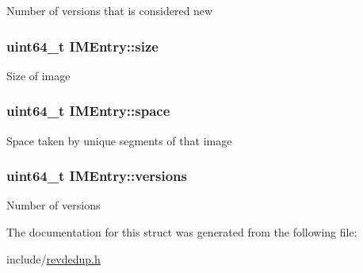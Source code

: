 \-Number of versions that is considered new \hypertarget{structIMEntry_a840792a083a5fea0688ecb8ef81b64ff}{
\subsubsection[{size}]{\setlength{\rightskip}{0pt plus 5cm}uint64\-\_\-t {\bf \-I\-M\-Entry\-::size}}}\label{structIMEntry_a840792a083a5fea0688ecb8ef81b64ff}
\-Size of image \hypertarget{structIMEntry_a07ed875542ea7af03722ec8cfbe0d5ef}{
\subsubsection[{space}]{\setlength{\rightskip}{0pt plus 5cm}uint64\-\_\-t {\bf \-I\-M\-Entry\-::space}}}\label{structIMEntry_a07ed875542ea7af03722ec8cfbe0d5ef}
\-Space taken by unique segments of that image \hypertarget{structIMEntry_ac8f61be1d9ea807db5b855e67ef596db}{
\subsubsection[{versions}]{\setlength{\rightskip}{0pt plus 5cm}uint64\-\_\-t {\bf \-I\-M\-Entry\-::versions}}}\label{structIMEntry_ac8f61be1d9ea807db5b855e67ef596db}
\-Number of versions 

\-The documentation for this struct was generated from the following file\-:\begin{DoxyCompactItemize}
\item 
include/\hyperlink{revdedup_8h}{revdedup.\-h}\end{DoxyCompactItemize}

